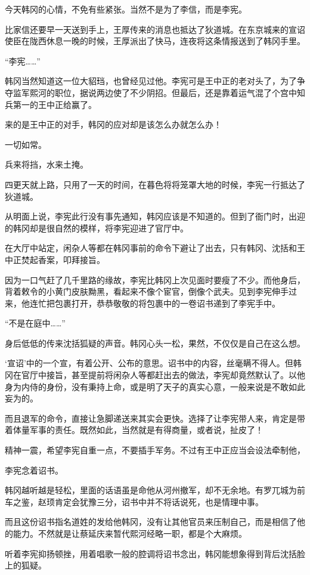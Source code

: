 今天韩冈的心情，不免有些紧张。当然不是为了李信，而是李宪。

比家信还要早一天送到手上，王厚传来的消息也抵达了狄道城。在东京城来的宣诏使臣在陇西休息一晚的时候，王厚派出了快马，连夜将这条情报送到了韩冈手里。

“李宪……”

韩冈当然知道这一位大貂珰，也曾经见过他。李宪可是王中正的老对头了，为了争夺监军熙河的职位，据说两边使了不少阴招。但最后，还是靠着运气混了个宫中知兵第一的王中正给赢了。

来的是王中正的对手，韩冈的应对却是该怎么办就怎么办！

一切如常。

兵来将挡，水来土掩。

四更天就上路，只用了一天的时间，在暮色将将笼罩大地的时候，李宪一行抵达了狄道城。

从明面上说，李宪此行没有事先通知，韩冈应该是不知道的。但到了衙门时，出迎的韩冈却是很自然的模样，将李宪迎进了官厅中。

在大厅中站定，闲杂人等都在韩冈事前的命令下避让了出去，只有韩冈、沈括和王中正焚起香案，叩拜接旨。

因为一口气赶了几千里路的缘故，李宪比韩冈上次见面时要瘦了不少。而他身后，背着敕令的小黄门皮肤黝黑，看起来不像个宦官，倒像个武夫。见到李宪伸手过来，他连忙把包裹打开，恭恭敬敬的将包裹中的一卷诏书递到了李宪手中。

“不是在庭中……”

身后低低的传来沈括狐疑的声音。韩冈心头一松，果然，不仅仅是自己在这么想。

‘宣诏’中的一个宣，有着公开、公布的意思。诏书中的内容，丝毫瞒不得人。但韩冈在官厅中接旨，甚至提前将闲杂人等都赶出去的做法，李宪却竟然默认了。以他身为内侍的身份，没有秉持上命，或是明了天子的真实心意，一般来说是不敢如此妄为的。

而且退军的命令，直接让急脚递送来其实会更快。选择了让李宪带人来，肯定是带着体量军事的责任。既然如此，当然就是有得商量，或者说，扯皮了！

精神一震，希望李宪自重一点，不要插手军务。不过有王中正应当会设法牵制他，

李宪念着诏书。

韩冈越听越是轻松，里面的话语虽是命他从河州撤军，却不无余地。有罗兀城为前车之鉴，赵顼肯定会犹豫三分，诏书中并不将话说死，也是情理中事。

而且这份诏书指名道姓的发给他韩冈，没有让其他官员来压制自己，而是相信了他的能力。不然就是让蔡延庆来暂代熙河经略一职，都是个大麻烦。

听着李宪抑扬顿挫，用着唱歌一般的腔调将诏书念出，韩冈能想象得到背后沈括脸上的狐疑。


